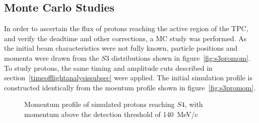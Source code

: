 \subsection{Monte Carlo Studies}
In order to ascertain the flux of protons reaching the active region of the TPC, and verify the deadtime and other corrections, a MC study was performed. 
As the initial beam characteristics were not fully known, particle positions and momenta were drawn from the $\mathit{S3}$ distributions shown in figure~\ref{fig:s3promom}. To study protons, the same timing and amplitude cuts described in section~\ref{timeofflightanalysissubsec} were applied.
The initial simulation profile is constructed identically from the moentum profile shown in figure~\ref{fig:s3promom}.

\begin{figure}[ht]
  \centering
     \begin{adjustbox}{max totalsize={\textwidth}{.35\textheight}, center}
      
    \end{adjustbox}
    \caption{Momentum profile of simulated protons reaching $\mathit{S4}$, with momentum above the detection threshold of 140~MeV/c}
    \label{fig:MCS4}
\end{figure}



%      

